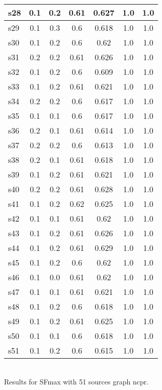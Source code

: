 \documentclass{article}
\begin{document}
\begin{tabular}{|l|c|c|c|c|c|c|}
\hline
s28 &0.1 & 0.2 & 0.61 & 0.627 & 1.0 & 1.0\\
\hline
s29 &0.1 & 0.3 & 0.6 & 0.618 & 1.0 & 1.0\\
\hline
s30 &0.1 & 0.2 & 0.6 & 0.62 & 1.0 & 1.0\\
\hline
s31 &0.2 & 0.2 & 0.61 & 0.626 & 1.0 & 1.0\\
\hline
s32 &0.1 & 0.2 & 0.6 & 0.609 & 1.0 & 1.0\\
\hline
s33 &0.1 & 0.2 & 0.61 & 0.621 & 1.0 & 1.0\\
\hline
s34 &0.2 & 0.2 & 0.6 & 0.617 & 1.0 & 1.0\\
\hline
s35 &0.1 & 0.1 & 0.6 & 0.617 & 1.0 & 1.0\\
\hline
s36 &0.2 & 0.1 & 0.61 & 0.614 & 1.0 & 1.0\\
\hline
s37 &0.2 & 0.2 & 0.6 & 0.613 & 1.0 & 1.0\\
\hline
s38 &0.2 & 0.1 & 0.61 & 0.618 & 1.0 & 1.0\\
\hline
s39 &0.1 & 0.2 & 0.61 & 0.621 & 1.0 & 1.0\\
\hline
s40 &0.2 & 0.2 & 0.61 & 0.628 & 1.0 & 1.0\\
\hline
s41 &0.1 & 0.2 & 0.62 & 0.625 & 1.0 & 1.0\\
\hline
s42 &0.1 & 0.1 & 0.61 & 0.62 & 1.0 & 1.0\\
\hline
s43 &0.1 & 0.2 & 0.61 & 0.626 & 1.0 & 1.0\\
\hline
s44 &0.1 & 0.2 & 0.61 & 0.629 & 1.0 & 1.0\\
\hline
s45 &0.1 & 0.2 & 0.6 & 0.62 & 1.0 & 1.0\\
\hline
s46 &0.1 & 0.0 & 0.61 & 0.62 & 1.0 & 1.0\\
\hline
s47 &0.1 & 0.1 & 0.61 & 0.621 & 1.0 & 1.0\\
\hline
s48 &0.1 & 0.2 & 0.6 & 0.618 & 1.0 & 1.0\\
\hline
s49 &0.1 & 0.2 & 0.61 & 0.625 & 1.0 & 1.0\\
\hline
s50 &0.1 & 0.1 & 0.6 & 0.618 & 1.0 & 1.0\\
\hline
s51 &0.1 & 0.2 & 0.6 & 0.615 & 1.0 & 1.0\\
\hline
\end{tabular}\\

\noindent Results for SFmax with 51 sources graph ncpr.
\end{document}
